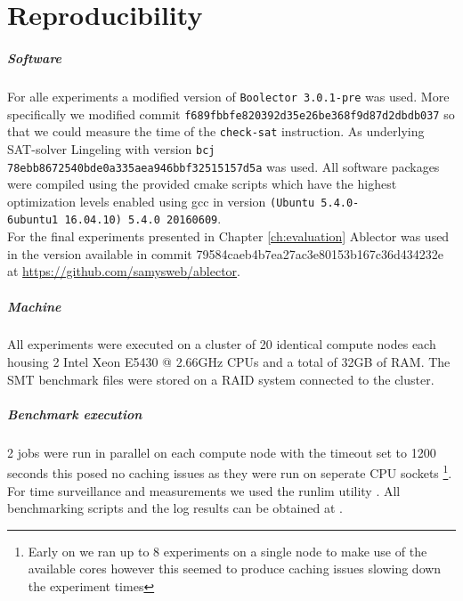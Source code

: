 
\chapter{Reproducibility}
\label{sec:appendix:reproducibility}
\paragraph{Software}
For alle experiments a modified version of \texttt{Boolector 3.0.1-pre} was used.
More specifically we modified commit \texttt{f689fbbfe820392d35e26be368f9d87d2dbdb037} so that we could measure the time of the \texttt{check-sat} instruction.
As underlying SAT-solver Lingeling \cite{Biere-SAT-Competition-2017-solvers} with version \texttt{bcj 78ebb8672540bde0a335aea946bbf32515157d5a} was used.
All software packages were compiled using the provided cmake scripts which have the highest optimization levels enabled using gcc in version \texttt{(Ubuntu 5.4.0-6ubuntu1~16.04.10) 5.4.0 20160609}.\\
For the final experiments presented in Chapter \ref{ch:evaluation} Ablector was used in the version available in commit 79584caeb4b7ea27ac3e80153b167c36d434232e at \url{https://github.com/samysweb/ablector}.

\paragraph{Machine}
All experiments were executed on a cluster of 20 identical compute nodes each housing 2 Intel Xeon E5430 @ 2.66GHz CPUs and a total of 32GB of RAM.
The SMT benchmark files were stored on a RAID system connected to the cluster.

\paragraph{Benchmark execution}
2 jobs were run in parallel on each compute node with the timeout set to 1200 seconds
this posed no caching issues as they were run on seperate CPU sockets
\footnote{Early on we ran up to 8 experiments on a single node to make use of the available cores however this seemed to produce caching issues slowing down the experiment times}.
For time surveillance and measurements we used the runlim utility \cite{runlim}.
All benchmarking scripts and the log results can be obtained at .

\renewcommand{\simplechapterdelim}{.}
\listoffigures